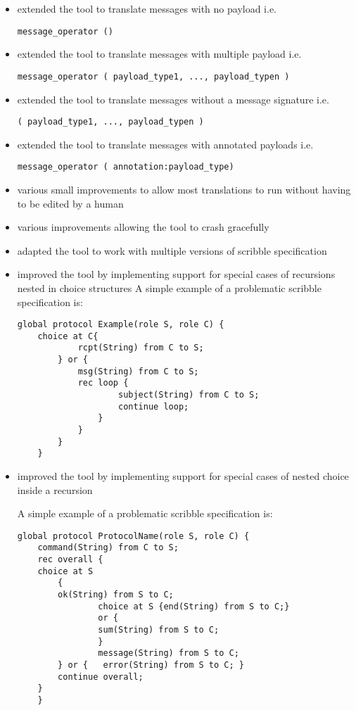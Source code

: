\begin{itemize}
  \item extended the tool to translate messages with no payload i.e.
  \begin{lstlisting}[basicstyle=\footnotesize]
    message_operator ()
  \end{lstlisting}
  \item extended the tool to translate messages with multiple payload i.e.
  \begin{lstlisting}[basicstyle=\footnotesize]
    message_operator ( payload_type1, ..., payload_typen )
  \end{lstlisting}
  \item extended the tool to translate messages without a message signature i.e.
  \begin{lstlisting}[basicstyle=\footnotesize]
    ( payload_type1, ..., payload_typen )
  \end{lstlisting}
  \item extended the tool to translate messages with annotated payloads i.e.
  \begin{lstlisting}[basicstyle=\footnotesize]
    message_operator ( annotation:payload_type)
  \end{lstlisting}
  \item various small improvements to allow most translations to run without having to be edited by a human
  \item various improvements allowing the tool to crash gracefully
  \item adapted the tool to work with multiple versions of scribble specification
  \item improved the tool by implementing support for special cases of recursions nested in choice structures
  A simple example of a problematic scribble specification is:
  \begin{lstlisting}[basicstyle=\footnotesize]
    global protocol Example(role S, role C) {
    choice at C{
            rcpt(String) from C to S;
        } or {
            msg(String) from C to S;
            rec loop {
                    subject(String) from C to S;
                    continue loop;
                }
            }
        }
    }
  \end{lstlisting}
  \item improved the tool by implementing support for special cases of nested choice inside a recursion

  A simple example of a problematic scribble specification is:
  \begin{lstlisting}[basicstyle=\footnotesize]
  global protocol ProtocolName(role S, role C) {
    command(String) from C to S;
    rec overall {
    choice at S
    	{
    	ok(String) from S to C;
    			choice at S {end(String) from S to C;}
    			or {
    			sum(String) from S to C;
    			}
    			message(String) from S to C;
    	} or {	 error(String) from S to C;	}
    	continue overall;
    }
    }
  \end{lstlisting}


\end{itemize}
